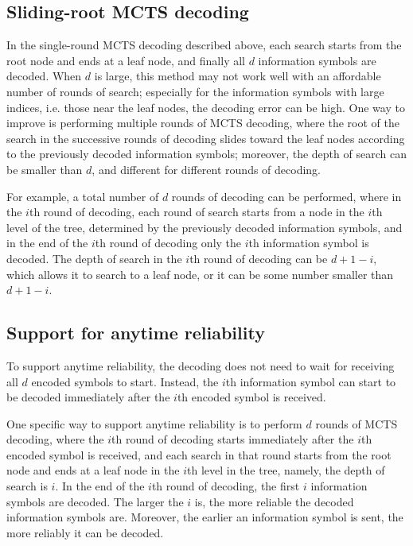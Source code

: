 \documentclass[conference,letterpaper]{IEEEtran}
\begin{document}
\subsection{Sliding-root MCTS decoding}
In the single-round MCTS decoding described above, each search starts from the root node and ends at a leaf node, and finally all $d$ information symbols are decoded.
When $d$ is large, this method may not work well with an affordable number of rounds of search; especially for the information symbols with large indices, i.e. those near the leaf nodes, the decoding error can be high.
One way to improve is performing multiple rounds of MCTS decoding, where the root of the search in the successive rounds of decoding slides toward the leaf nodes according to the previously decoded information symbols; moreover, the depth of search can be smaller than $d$, and different for different rounds of decoding.

For example, a total number of $d$ rounds of decoding can be performed, where in the $i$th round of decoding, each round of search starts from a node in the $i$th level of the tree, determined by the previously decoded information symbols, and in the end of the $i$th round of decoding only the $i$th information symbol is decoded. The depth of search in the $i$th round of decoding can be $d+1-i$, which allows it to search to a leaf node, or it can be some number smaller than $d+1-i$.



\subsection{Support for anytime reliability}
To support anytime reliability, the decoding does not need to wait for receiving all $d$ encoded symbols to start. Instead, the $i$th information symbol can start to be decoded immediately after the $i$th encoded symbol is received.

One specific way to support anytime reliability is to perform $d$ rounds of MCTS decoding, where the $i$th round of decoding starts immediately after the $i$th encoded symbol is received, and each search in that round starts from the root node and ends at a leaf node in the $i$th level in the tree, namely, the depth of search is $i$. In the end of the $i$th round of decoding, the first $i$ information symbols are decoded. The larger the $i$ is, the more reliable the decoded information symbols are. Moreover, the earlier an information symbol is sent, the more reliably it can be decoded.
\end{document}
